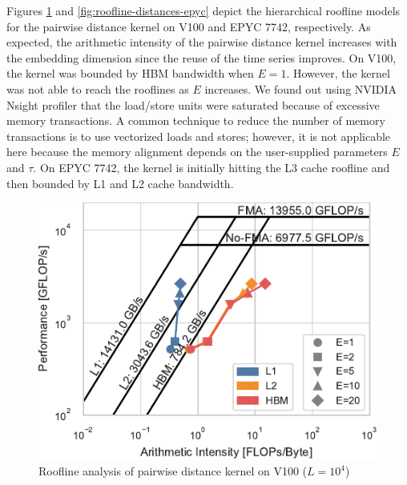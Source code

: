 \documentclass[sigconf]{acmart}
\begin{document}

Figures \ref{fig:roofline-distances-v100} and \ref{fig:roofline-distances-epyc}
depict the hierarchical roofline models for the pairwise distance kernel on V100
and EPYC 7742, respectively. As expected, the arithmetic intensity of the
pairwise distance kernel increases with the embedding dimension since the
reuse of the time series improves. On V100, the kernel was bounded by HBM
bandwidth when $E=1$. However, the kernel was not able to reach the rooflines
as $E$ increases. We found out using NVIDIA Nsight profiler that the load/store
units were saturated because of excessive memory transactions. A common
technique to reduce the number of memory transactions is to use vectorized
loads and stores; however, it is not applicable here because the memory
alignment depends on the user-supplied parameters $E$ and $\tau$. On EPYC 7742,
the kernel is initially hitting the L3 cache roofline and then bounded by
L1 and L2 cache bandwidth.

\begin{figure}
    \centering
    \includegraphics[width=.90\linewidth]{figs/roofline_distances_v100}
    \caption{Roofline analysis of pairwise distance kernel on V100 ($L=10^4$)}%
    \label{fig:roofline-distances-v100}
\end{figure}
\end{document}
